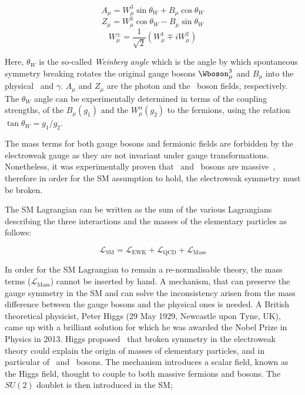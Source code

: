 			\begin{equation}
			\label{eq:photon}
				A_{\mu} = W_{\mu}^3 \sin\theta_W  + B_{\mu}\cos \theta_W 
			\end{equation}
			\begin{equation}
			\label{eq:Zboson}
				Z_{\mu} = W_{\mu}^3\cos\theta_W  - B_{\mu} \sin \theta_W
			\end{equation}
			\begin{equation}
			\label{eq:Wboson}
				W_{\mu}^\pm = \frac{1}{\sqrt{2}} \displaystyle \left ( W_{\mu}^1 \mp i W_{\mu}^2 \right )
			\end{equation}

			\noindent Here, $\theta_W$ is the so-called \emph{Weinberg angle} which is the angle by which spontaneous symmetry breaking rotates the original gauge bosons $\Wboson_{\mu}^3$ and $B_{\mu}$ into the physical \Zboson\ and $\gamma$. $A_\mu$ and $Z_\mu$ are the photon and the \Zboson\ boson fields, respectively. The $\theta_W$ angle can be experimentally determined in terms of the coupling strengths, of the $B_{\mu}(g_1)$ and the $W_{\mu}^\alpha (g_2)$ to the fermions, using the relation $\tan\theta_W = g_1 / g_2 $. 

			The mass terms for both gauge bosons and fermionic fields are forbidden by the electroweak gauge as they are not invariant under gauge transformations. Nonetheless, it was experimentally proven that \Wboson\ and \Zboson\ bosons are massive~\cite{Pich2012}, therefore in order for the \ac{SM} assumption to hold, the electroweak symmetry must be broken. 

			The \ac{SM} Lagrangian can be written as the sum of the various Lagrangians describing the three interactions and the masses of the elementary particles as follows:

			\begin{equation}
			\label{eq:SM_Lagrangian}
				\mathcal{L_{\mathrm{SM}}} = \mathcal{L_{\mathrm{EWK}}} + \mathcal{L_{\mathrm{QCD}}} + \mathcal{L_{\mathrm{Mass}}}
			\end{equation}

			\noindent In order for the \ac{SM} Lagrangian to remain a re-normalisable theory, the mass terms ($\mathcal{L_{\mathrm{Mass}}}$) cannot be inserted by hand. A mechanism, that can preserve the gauge symmetry in the \ac{SM} and can solve the inconsistency arisen from the mass difference between the gauge bosons and the physical ones is needed. A British theoretical physicist, Peter Higgs (29 May 1929, Newcastle upon Tyne, UK), came up with a brilliant solution for which he was awarded the Nobel Prize in Physics in 2013. Higgs proposed~\cite{Higgs1964} that broken symmetry in the electroweak theory could explain the origin of masses of elementary particles, and in particular of \Wboson\ and \Zboson\ bosons. The mechanism introduces a scalar field, known as the Higgs field, thought to couple to both massive fermions and bosons. The $SU(2)$ doublet is then introduced in the \ac{SM};

